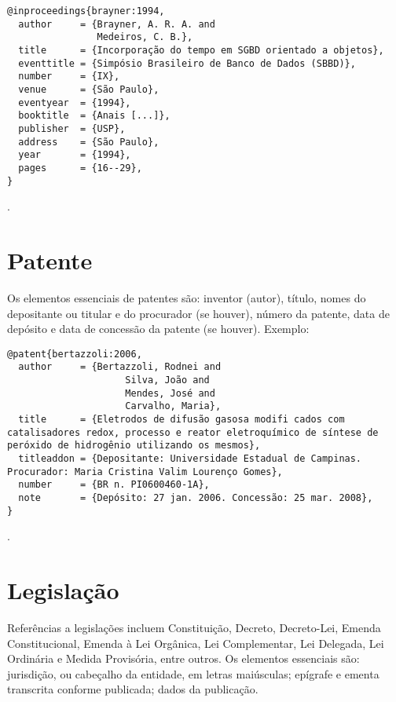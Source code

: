 \vspace*{1em}

\begin{verbatim}
@inproceedings{brayner:1994,
  author     = {Brayner, A. R. A. and
                Medeiros, C. B.},
  title      = {Incorporação do tempo em SGBD orientado a objetos},
  eventtitle = {Simpósio Brasileiro de Banco de Dados (SBBD)},
  number     = {IX},
  venue      = {São Paulo},
  eventyear  = {1994},
  booktitle  = {Anais [...]},
  publisher  = {USP},
  address    = {São Paulo},
  year       = {1994},
  pages      = {16--29},
}
\end{verbatim}

\noindent
{}.


\section{Patente}

Os elementos essenciais de patentes são: inventor (autor), título, nomes do depositante ou titular e do procurador (se houver), número da patente, data de depósito e data de concessão da patente (se houver).
Exemplo:

\vspace*{1em}

\begin{verbatim}
@patent{bertazzoli:2006,
  author     = {Bertazzoli, Rodnei and
                     Silva, João and
                     Mendes, José and
                     Carvalho, Maria},
  title      = {Eletrodos de difusão gasosa modifi cados com catalisadores redox, processo e reator eletroquímico de síntese de peróxido de hidrogênio utilizando os mesmos},
  titleaddon = {Depositante: Universidade Estadual de Campinas. Procurador: Maria Cristina Valim Lourenço Gomes},
  number     = {BR n. PI0600460-1A},
  note       = {Depósito: 27 jan. 2006. Concessão: 25 mar. 2008},
}
\end{verbatim}

\noindent
{}.

\section{Legislação}

Referências a legislações incluem Constituição, Decreto, Decreto-Lei, Emenda Constitucional, Emenda à Lei Orgânica, Lei Complementar, Lei Delegada, Lei Ordinária e Medida Provisória, entre outros.
Os elementos essenciais são: jurisdição, ou cabeçalho da entidade, em letras maiúsculas; epígrafe e ementa transcrita conforme publicada; dados da publicação.

